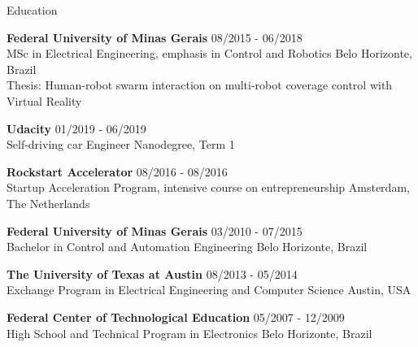 \documentclass[14pt, a4paper]{resume} %
\begin{document}



\begin{rSection}{Education}

{\bf Federal University of Minas Gerais}  \hfill{08/2015 - 06/2018} \\ 
MSc in Electrical Engineering, emphasis in Control and Robotics \hfill{Belo Horizonte, Brazil} \\
Thesis: Human-robot swarm interaction on multi-robot coverage control with Virtual Reality 

{\bf Udacity}  \hfill{01/2019 - 06/2019} \\ 
Self-driving car Engineer Nanodegree, Term 1 

{\bf Rockstart Accelerator}  \hfill{08/2016 - 08/2016} \\ 
Startup Acceleration Program, intensive course on entrepreneurship \hfill{Amsterdam, The Netherlands} 

{\bf Federal University of Minas Gerais}  \hfill{03/2010 - 07/2015} \\ 
Bachelor in Control and Automation Engineering \hfill{Belo Horizonte, Brazil}

{\bf The University of Texas at Austin} \hfill {08/2013 - 05/2014} \\ 
Exchange Program in Electrical Engineering and Computer Science \hfill {Austin, USA}

{\bf Federal Center of Technological Education} \hfill {05/2007 - 12/2009} \\ 
High School and Technical Program in Electronics \hfill{Belo Horizonte, Brazil}

\end{rSection}

\end{document}
